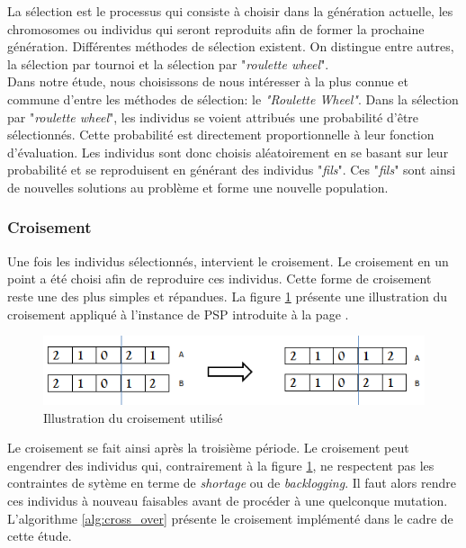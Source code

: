 \documentclass[12pt,a4paper]{article}
\begin{document}
		La sélection est le processus qui consiste à choisir dans la génération actuelle, les chromosomes ou individus qui seront reproduits afin de former la prochaine génération. Différentes méthodes de sélection existent. On distingue entre autres, la sélection par tournoi et la sélection par "\emph{roulette wheel}". \\
		\hspace*{.5cm} Dans notre étude, nous choisissons de nous intéresser à la plus connue et commune d'entre les méthodes de sélection: le \emph{"Roulette Wheel"}. Dans la sélection par "\emph{roulette wheel}", les individus se voient attribués une probabilité d'être sélectionnés. Cette probabilité est directement proportionnelle à leur fonction d'évaluation. Les individus sont donc choisis aléatoirement en se basant sur leur probabilité et se reproduisent en générant des individus "\emph{fils}". Ces "\emph{fils}" sont ainsi de nouvelles solutions au problème et forme une nouvelle population.		
		
		\subsubsection{Croisement}
		
		Une fois les individus sélectionnés, intervient le croisement. Le croisement en un point a été choisi afin de reproduire ces individus. Cette forme de croisement reste une des plus simples et répandues. La figure \ref{fig:used_cross_over} présente une illustration du croisement appliqué à l'instance de PSP introduite à la page \pageref{sec:problem_description}. \\
		\begin{figure}[!h]
			\begin{center}
				\includegraphics[scale=.5]{img/cross_over_fig.png}
				\caption{Illustration du croisement utilisé}
				\label{fig:used_cross_over}
			\end{center}
		\end{figure}
		
		\hspace*{.5cm} Le croisement se fait ainsi après la troisième période. Le croisement peut engendrer des individus qui, contrairement à la figure \ref{fig:used_cross_over}, ne respectent pas les contraintes de sytème en terme de \emph{shortage} ou de \emph{backlogging}. Il faut alors rendre ces individus à nouveau faisables avant de procéder à une quelconque mutation. L'algorithme \ref{alg:cross_over} présente le croisement implémenté dans le cadre de cette étude.\\
		
\end{document}
